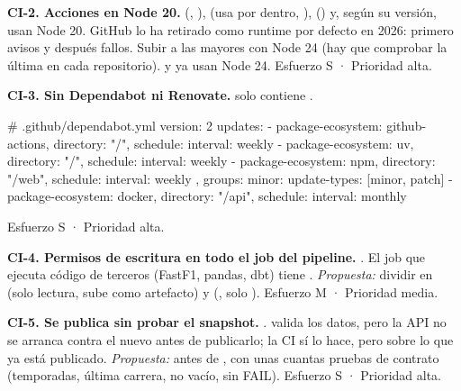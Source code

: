 \textbf{CI-2. Acciones en Node 20.}  (, ),  (usa  por dentro, ),  () y, según su versión,  usan Node 20. GitHub lo ha retirado como runtime por defecto en 2026: primero avisos y después fallos. Subir a las mayores con Node 24 (hay que comprobar la última en cada repositorio).  y  ya usan Node 24. Esfuerzo S · Prioridad alta.

\textbf{CI-3. Sin Dependabot ni Renovate.}  solo contiene .

\begin{codigo}
# .github/dependabot.yml
version: 2
updates:
  - { package-ecosystem: github-actions, directory: "/", schedule: { interval: weekly } }
  - { package-ecosystem: uv, directory: "/", schedule: { interval: weekly } }
  - { package-ecosystem: npm, directory: "/web", schedule: { interval: weekly },
      groups: { minor: { update-types: [minor, patch] } } }
  - { package-ecosystem: docker, directory: "/api", schedule: { interval: monthly } }
\end{codigo}

Esfuerzo S · Prioridad alta.

\textbf{CI-4. Permisos de escritura en todo el job del pipeline.} . El job que ejecuta código de terceros (FastF1, pandas, dbt) tiene . \emph{Propuesta:} dividir en  (solo lectura, sube  como artefacto) y  (, solo ). Esfuerzo M · Prioridad media.

\textbf{CI-5. Se publica sin probar el snapshot.} .  valida los datos, pero la API no se arranca contra el  nuevo antes de publicarlo; la CI sí lo hace, pero sobre lo que ya está publicado. \emph{Propuesta:} antes de ,  con unas cuantas pruebas de contrato (temporadas, última carrera,  no vacío,  sin FAIL). Esfuerzo S · Prioridad alta.


